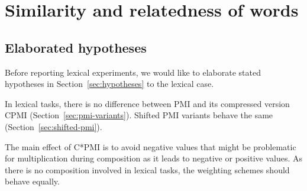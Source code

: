 



\chapter{Similarity and relatedness of words}
\label{sec:lexical}

\section{Elaborated hypotheses}
\label{sec:elab-hypoth-lexical}

Before reporting lexical experiments, we would like to elaborate stated hypotheses in Section~\ref{sec:hypotheses} to the lexical case.

\begin{hyp}
  \label{hyp:lex-pmi-cpmi}
  In lexical tasks, there is no difference between PMI and its compressed version CPMI (Section~\ref{sec:pmi-variants}). Shifted PMI variants behave the same (Section~\ref{sec:shifted-pmi}).
\end{hyp}

The main effect of C*PMI is to avoid negative values that might be problematic for multiplication during composition as it leads to negative or positive values. As there is no composition involved in lexical tasks, the weighting schemes should behave equally.


